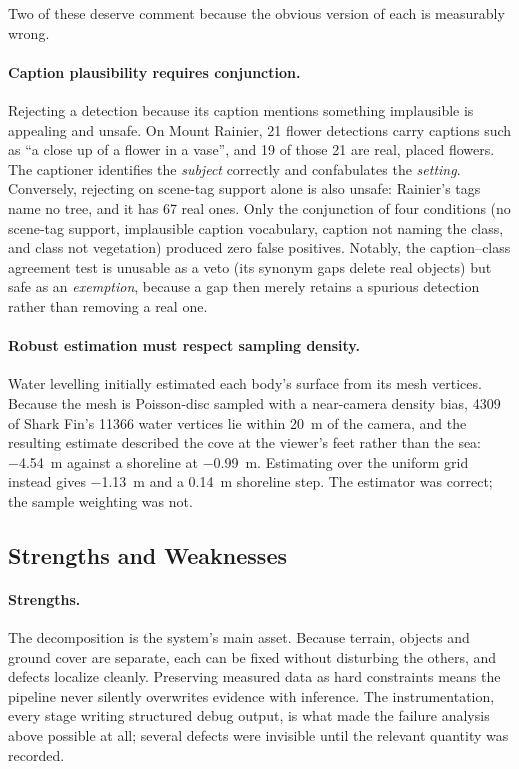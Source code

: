 Two of these deserve comment because the obvious version of each is measurably
wrong.

\paragraph{Caption plausibility requires conjunction.}
Rejecting a detection because its caption mentions something implausible is
appealing and unsafe. On Mount Rainier, 21 flower detections carry captions such as
``a close up of a flower in a vase'', and \num{19} of those \num{21} are real,
placed flowers. The captioner identifies the \emph{subject} correctly and
confabulates the \emph{setting}. Conversely, rejecting on scene-tag support alone
is also unsafe: Rainier's tags name no tree, and it has \num{67} real ones. Only
the conjunction of four conditions (no scene-tag support, implausible caption
vocabulary, caption not naming the class, and class not vegetation) produced
zero false positives. Notably, the caption--class agreement test is unusable as a
veto (its synonym gaps delete real objects) but safe as an \emph{exemption}, because
a gap then merely retains a spurious detection rather than removing a real one.

\paragraph{Robust estimation must respect sampling density.}
Water levelling initially estimated each body's surface from its mesh vertices.
Because the mesh is Poisson-disc sampled with a near-camera density bias,
\num{4309} of Shark Fin's \num{11366} water vertices lie within \SI{20}{\meter} of
the camera, and the resulting estimate described the cove at the viewer's feet
rather than the sea: \SI{-4.54}{\meter} against a shoreline at
\SI{-0.99}{\meter}. Estimating over the uniform grid instead gives
\SI{-1.13}{\meter} and a \SI{0.14}{\meter} shoreline step. The estimator was
correct; the sample weighting was not.

\subsection{Strengths and Weaknesses}

\paragraph{Strengths.}
The decomposition is the system's main asset. Because terrain, objects and ground
cover are separate, each can be fixed without disturbing the others, and defects
localize cleanly. Preserving measured data as hard constraints means the pipeline
never silently overwrites evidence with inference. The instrumentation, every
stage writing structured debug output, is what made the failure analysis above
possible at all; several defects were invisible until the relevant quantity was
recorded.

